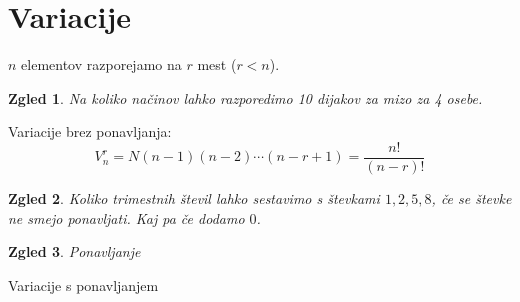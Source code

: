 \documentclass{article}
\newtheorem*{zgled}{Zgled}
\begin{document}
\section{Variacije}

$n$ elementov razporejamo na $r$ mest ($r<n$).

\begin{zgled}
    Na koliko načinov lahko razporedimo 10 dijakov za mizo za 4 osebe.
\end{zgled}

Variacije brez ponavljanja:
\[V_n ^r = N(n-1)(n-2)\cdots (n-r+1)=\frac{n!}{(n-r)!}\]

\begin{zgled}
    Koliko trimestnih števil lahko sestavimo s števkami $1,2,5,8$, če se števke ne smejo ponavljati. Kaj pa če dodamo $0$.
\end{zgled}

\begin{zgled}
    Ponavljanje
\end{zgled}

Variacije s ponavljanjem
\end{document}
